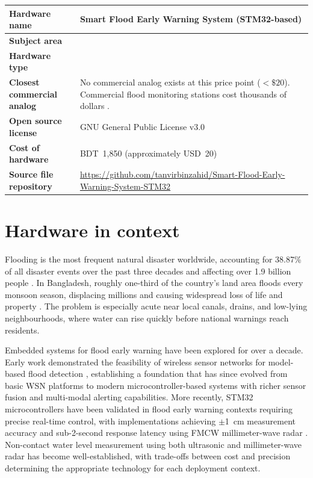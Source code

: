\documentclass[5p,twocolumn]{elsarticle}
\begin{document}
\medskip
\noindent
\begin{minipage}{\columnwidth}
\centering
\scriptsize
\setlength{\tabcolsep}{3pt}
\begin{tabular}{|L{4.5cm}|L{4.5cm}|}
  \hline
  \textbf{Hardware name} & Smart Flood Early Warning System (STM32-based) \\ \hline
  \textbf{Subject area} &  \\ \hline
  \textbf{Hardware type} &  \\ \hline
  \textbf{Closest commercial analog} & No commercial analog exists at this price point (${<}\$20$). Commercial flood monitoring stations cost thousands of dollars \cite{bwdb2022}. \\ \hline
  \textbf{Open source license} & GNU General Public License v3.0 \\ \hline
  \textbf{Cost of hardware} & BDT~1,850 (approximately USD~20) \\ \hline
  \textbf{Source file repository} & \url{https://github.com/tanvirbinzahid/Smart-Flood-Early-Warning-System-STM32} \\ \hline
\end{tabular}
\end{minipage}
\medskip


\section{Hardware in context}

Flooding is the most frequent natural disaster worldwide, accounting for 38.87\% of all disaster events over the past three decades and affecting over 1.9 billion people \cite{tao2024}. In Bangladesh, roughly one-third of the country's land area floods every monsoon season, displacing millions and causing widespread loss of life and property \cite{bwdb2022}. The problem is especially acute near local canals, drains, and low-lying neighbourhoods, where water can rise quickly before national warnings reach residents.

Embedded systems for flood early warning have been explored for over a decade. Early work demonstrated the feasibility of wireless sensor networks for model-based flood detection \cite{basha2008}, establishing a foundation that has since evolved from basic WSN platforms to modern microcontroller-based systems with richer sensor fusion and multi-modal alerting capabilities. More recently, STM32 microcontrollers have been validated in flood early warning contexts requiring precise real-time control, with implementations achieving $\pm$1~cm measurement accuracy and sub-2-second response latency using FMCW millimeter-wave radar \cite{zeng2025}. Non-contact water level measurement using both ultrasonic \cite{rohan2025} and millimeter-wave radar \cite{shui2022,zeng2025} has become well-established, with trade-offs between cost and precision determining the appropriate technology for each deployment context.
\end{document}
